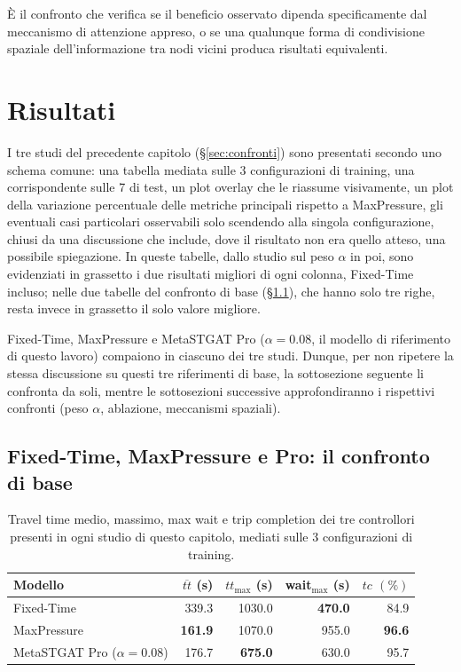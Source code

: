 È il confronto che verifica se il beneficio osservato dipenda
specificamente dal meccanismo di attenzione appreso, o se una qualunque
forma di condivisione spaziale dell'informazione tra nodi vicini produca
risultati equivalenti.

\section{Risultati}
\label{sec:risultati-baseline}

I tre studi del precedente capitolo (§\ref{sec:confronti}) sono presentati
secondo uno schema comune: una tabella mediata sulle 3 configurazioni di
training, una corrispondente sulle 7 di test, un plot overlay che le
riassume visivamente, un plot della variazione percentuale delle metriche principali rispetto a
MaxPressure, gli eventuali casi particolari osservabili solo scendendo
alla singola configurazione, chiusi da una discussione che include, dove il risultato non
era quello atteso, una possibile spiegazione.
In queste tabelle, dallo studio sul peso $\alpha$ in poi, sono evidenziati
in grassetto i due risultati migliori di ogni colonna, Fixed-Time incluso;
nelle due tabelle del confronto di base (§\ref{sec:risultati-base}), che
hanno solo tre righe, resta invece in grassetto il solo valore migliore.

Fixed-Time, MaxPressure e MetaSTGAT Pro ($\alpha=0.08$, il modello di
riferimento di questo lavoro) compaiono in ciascuno dei tre studi.
Dunque, per non ripetere la stessa discussione su questi tre riferimenti di base,
la sottosezione seguente li confronta da soli,
mentre le sottosezioni successive approfondiranno i rispettivi confronti
(peso $\alpha$, ablazione, meccanismi spaziali).

\subsection{Fixed-Time, MaxPressure e Pro: il confronto di base}
\label{sec:risultati-base}

\begin{table}[htbp]
  \centering
  \begin{tabular}{@{}lrrrr@{}}
    \toprule
    Modello                       & $\overline{tt}$ (s) & $tt_{\max}$ (s) & wait$_{\max}$ (s) & $tc$ $(\%)$   \\
    \midrule
    Fixed-Time                    & 339.3               & 1030.0          & \textbf{470.0}    & 84.9          \\
    MaxPressure                   & \textbf{161.9}      & 1070.0          & 955.0             & \textbf{96.6} \\
    MetaSTGAT Pro ($\alpha=0.08$) & 176.7               & \textbf{675.0}  & 630.0             & 95.7          \\
    \bottomrule
  \end{tabular}
  \caption{Travel time medio, massimo, max wait e trip completion dei tre
    controllori presenti in ogni studio di questo capitolo, mediati sulle 3
    configurazioni di training.}
  \label{tab:base-train}
\end{table}

